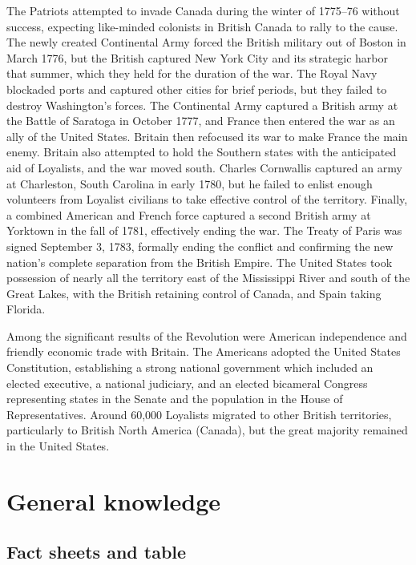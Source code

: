 \documentclass[
  openany]{book}
\begin{document}
The Patriots attempted to invade Canada during the winter of 1775--76 without success, expecting like-minded colonists in British Canada to rally to the cause. The newly created Continental Army forced the British military out of Boston in March 1776, but the British captured New York City and its strategic harbor that summer, which they held for the duration of the war. The Royal Navy blockaded ports and captured other cities for brief periods, but they failed to destroy Washington's forces. The Continental Army captured a British army at the Battle of Saratoga in October 1777, and France then entered the war as an ally of the United States. Britain then refocused its war to make France the main enemy. Britain also attempted to hold the Southern states with the anticipated aid of Loyalists, and the war moved south. Charles Cornwallis captured an army at Charleston, South Carolina in early 1780, but he failed to enlist enough volunteers from Loyalist civilians to take effective control of the territory. Finally, a combined American and French force captured a second British army at Yorktown in the fall of 1781, effectively ending the war. The Treaty of Paris was signed September 3, 1783, formally ending the conflict and confirming the new nation's complete separation from the British Empire. The United States took possession of nearly all the territory east of the Mississippi River and south of the Great Lakes, with the British retaining control of Canada, and Spain taking Florida.

Among the significant results of the Revolution were American independence and friendly economic trade with Britain. The Americans adopted the United States Constitution, establishing a strong national government which included an elected executive, a national judiciary, and an elected bicameral Congress representing states in the Senate and the population in the House of Representatives. Around 60,000 Loyalists migrated to other British territories, particularly to British North America (Canada), but the great majority remained in the United States.

\hypertarget{general-knowledge}{%
\chapter{General knowledge}\label{general-knowledge}}

\hypertarget{fact-sheets-and-table}{%
\section{Fact sheets and table}\label{fact-sheets-and-table}}
\end{document}
